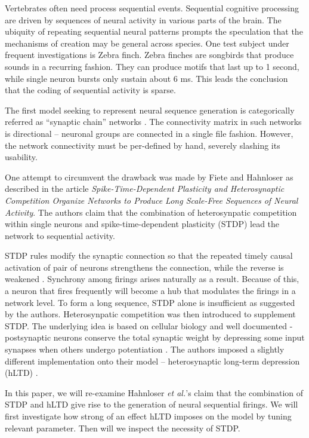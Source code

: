 Vertebrates often need process sequential events. Sequential cognitive processing are driven by sequences of neural activity in various parts of the brain. The ubiquity of repeating sequential neural patterns prompts the speculation that the mechanisms of creation may be general across species. One test subject under frequent investigations is Zebra finch. Zebra finches are songbirds that produce sounds in a recurring fashion.  They can produce motifs that last up to 1 second, while single neuron bursts only sustain about 6 ms. This leads the conclusion that the coding of sequential activity is sparse. 

The first model seeking to represent neural sequence generation is categorically referred as “synaptic chain” networks \cite{Kleinfeld1988}. The connectivity matrix in such networks is directional – neuronal groups are connected in a single file fashion. However, the network connectivity must be per-defined by hand, severely slashing its usability. 

One attempt to circumvent the drawback was made by Fiete and Hahnloser as described in the article \textit{Spike-Time-Dependent Plasticity and Heterosynaptic Competition Organize Networks to Produce Long Scale-Free Sequences of Neural Activity}. The authors claim that the combination of heterosynpatic competition within single neurons and spike-time-dependent plasticity (STDP) lead the network to sequential activity. 

STDP rules modify the synaptic connection so that the repeated timely causal activation of pair of neurons strengthens the connection, while the reverse is weakened \cite{Abbott2000}. Synchrony among firings arises naturally as a result. Because of this, a neuron that fires frequently will become a hub that modulates the firings in a network level. To form a long sequence, STDP alone is insufficient as suggested by the authors. Heterosynpatic competition was then introduced to supplement STDP. The underlying idea is  based on cellular biology and well documented - postsynaptic neurons conserve the total synaptic weight by depressing some input synapses when others undergo potentiation \cite{Royer2003}. The authors imposed a slightly different implementation onto their model – heterosynaptic long-term depression (hLTD) .


In this paper, we will re-examine Hahnloser \textit{et al.}'s claim that the combination of STDP and hLTD give rise to the generation of neural sequential firings. We will first investigate how strong of an effect hLTD imposes on the model by tuning relevant parameter. Then will we inspect the necessity of  STDP. 
